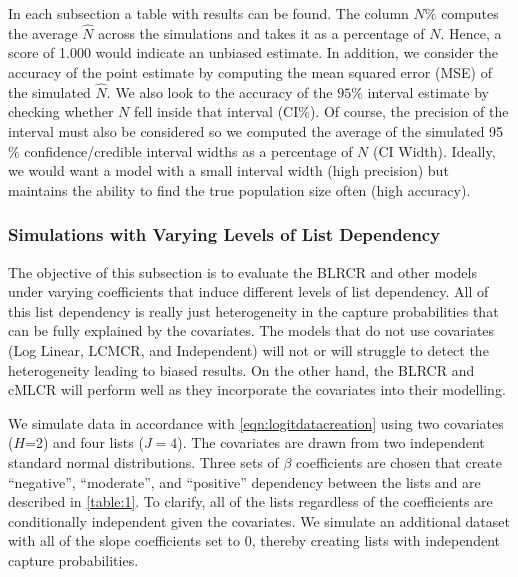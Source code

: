 \documentclass[
  12pt,
]{article}
\begin{document}
In each subsection a table with results can be found. The column \(N\%\)
computes the average \(\hat{N}\) across the simulations and takes it as
a percentage of \(N\). Hence, a score of 1.000 would indicate an
unbiased estimate. In addition, we consider the accuracy of the point
estimate by computing the mean squared error (MSE) of the simulated
\(\hat{N}\). We also look to the accuracy of the \(95\%\) interval
estimate by checking whether \(N\) fell inside that interval (CI\(\%\)).
Of course, the precision of the interval must also be considered so we
computed the average of the simulated 95\(\%\) confidence/credible
interval widths as a percentage of \(N\) (CI Width). Ideally, we would
want a model with a small interval width (high precision) but maintains
the ability to find the true population size often (high accuracy).

\subsubsection{Simulations with Varying Levels of List Dependency }
\label{Sec:simslistdepend}

The objective of this subsection is to evaluate the BLRCR and other
models under varying coefficients that induce different levels of list
dependency. All of this list dependency is really just heterogeneity in
the capture probabilities that can be fully explained by the covariates.
The models that do not use covariates (Log Linear, LCMCR, and
Independent) will not or will struggle to detect the heterogeneity
leading to biased results. On the other hand, the BLRCR and cMLCR will
perform well as they incorporate the covariates into their modelling.

We simulate data in accordance with \autoref{eqn:logitdatacreation}
using two covariates (\(H\)=2) and four lists (\(J=4\)). The covariates
are drawn from two independent standard normal distributions. Three sets
of \(\beta\) coefficients are chosen that create ``negative'',
``moderate'', and ``positive'' dependency between the lists and are
described in \autoref{table:1}. To clarify, all of the lists regardless
of the coefficients are conditionally independent given the covariates.
We simulate an additional dataset with all of the slope coefficients set
to 0, thereby creating lists with independent capture probabilities.
\end{document}
